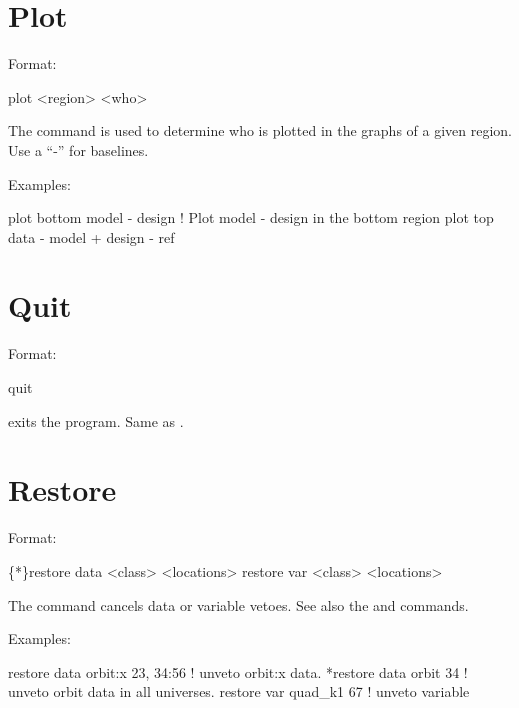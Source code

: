 \section{Plot}
\label{s:plot}

Format:
\begin{example}
  plot <region> <who>
\end{example}

\vskip 0.2in The  command is used to determine who is plotted
in the graphs of a given region. Use a ``-'' for baselines. 

Examples:
\begin{example}
  plot bottom model - design       ! Plot model - design in the bottom region
  plot top data - model + design - ref 
\end{example}

\section{Quit}
\label{s:quit}

Format:
\begin{example}
  quit
\end{example}

\vskip 0.2in
 exits the program. Same as .

\section{Restore}
\label{s:restore}

Format:
\begin{example}
  \{*\}restore data  <class> <locations>
  restore var <class> <locations>
\end{example}

\vskip 0.2in The  command cancels data or variable
vetoes. See also the 
and  commands.

Examples:
\begin{example}
  restore data orbit:x  23, 34:56 ! unveto orbit:x data.
  *restore data orbit 34          ! unveto orbit data in all universes.
  restore var quad_k1 67     ! unveto variable
\end{example}



